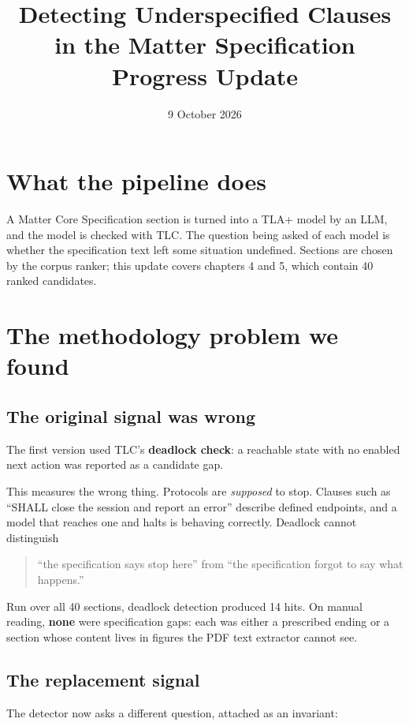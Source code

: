 \documentclass[11pt,a4paper]{article}
\title{Detecting Underspecified Clauses in the Matter Specification\\
       \large Progress Update}
\author{}
\date{9 October 2026}
\begin{document}
\maketitle

\section{What the pipeline does}

A Matter Core Specification section is turned into a TLA+ model by an LLM, and the
model is checked with TLC. The question being asked of each model is whether the
specification text left some situation undefined. Sections are chosen by the corpus
ranker; this update covers chapters 4 and 5, which contain 40 ranked candidates.

\section{The methodology problem we found}

\subsection{The original signal was wrong}

The first version used TLC's \textbf{deadlock check}: a reachable state with no
enabled next action was reported as a candidate gap.

This measures the wrong thing. Protocols are \emph{supposed} to stop. Clauses such
as ``SHALL close the session and report an error'' describe defined endpoints, and a
model that reaches one and halts is behaving correctly. Deadlock cannot distinguish

\begin{quote}
``the specification says stop here'' \quad from \quad ``the specification forgot to say
what happens.''
\end{quote}

Run over all 40 sections, deadlock detection produced 14 hits. On manual reading,
\textbf{none} were specification gaps: each was either a prescribed ending or a
section whose content lives in figures the PDF text extractor cannot see.

\subsection{The replacement signal}

The detector now asks a different question, attached as an invariant:
\end{document}
